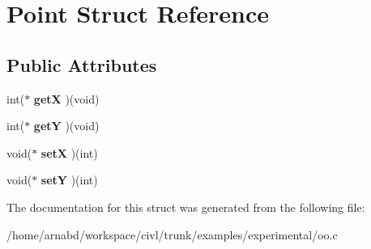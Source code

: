 \hypertarget{structPoint}{}\section{Point Struct Reference}
\label{structPoint}
\subsection*{Public Attributes}
\begin{DoxyCompactItemize}
\item 
\hypertarget{structPoint_acf9d822c140b0ee3bc3c9cf9708d8936}{}int($\ast$ {\bfseries get\+X} )(void)\label{structPoint_acf9d822c140b0ee3bc3c9cf9708d8936}

\item 
\hypertarget{structPoint_aad85f9018f3dd2163fff011a4c667911}{}int($\ast$ {\bfseries get\+Y} )(void)\label{structPoint_aad85f9018f3dd2163fff011a4c667911}

\item 
\hypertarget{structPoint_a058f8883914094282a4e95d0300f9ef8}{}void($\ast$ {\bfseries set\+X} )(int)\label{structPoint_a058f8883914094282a4e95d0300f9ef8}

\item 
\hypertarget{structPoint_a0d529a00df59db1f2457e40274ad22b0}{}void($\ast$ {\bfseries set\+Y} )(int)\label{structPoint_a0d529a00df59db1f2457e40274ad22b0}

\end{DoxyCompactItemize}


The documentation for this struct was generated from the following file\+:\begin{DoxyCompactItemize}
\item 
/home/arnabd/workspace/civl/trunk/examples/experimental/oo.\+c\end{DoxyCompactItemize}
